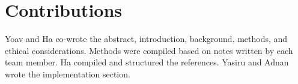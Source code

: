 \documentclass[11pt]{report}
\begin{document}
\chapter{Contributions}
Yoav and Ha co-wrote the abstract, introduction, background, methods, and ethical considerations. Methods were compiled based on notes written by each team member. Ha compiled and structured the references. Yasiru and Adnan wrote the implementation section.




\end{document}
